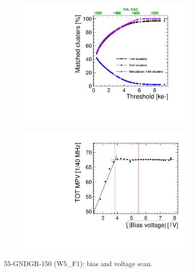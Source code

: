 \begin{figure}[htbp] \centering
  \begin{subfigure}[b]{0.45\textwidth}
    \includegraphics[width=\textwidth]{./figures/TestBeam/ThresholdScan_W0005_F01.pdf}
    \caption{}
  \end{subfigure} \hfill
  \begin{subfigure}[b]{0.45\textwidth}
    \includegraphics[width=\textwidth]{./figures/TestBeam/depletionVoltage_W0005_F01.pdf}
    \caption{}
  \end{subfigure}
  \caption{55-GNDGR-150 (W5\_F1): bias and voltage scan.}
  \label{fig:Timepix3_THLscan_Vdep_F1}
\end{figure}
